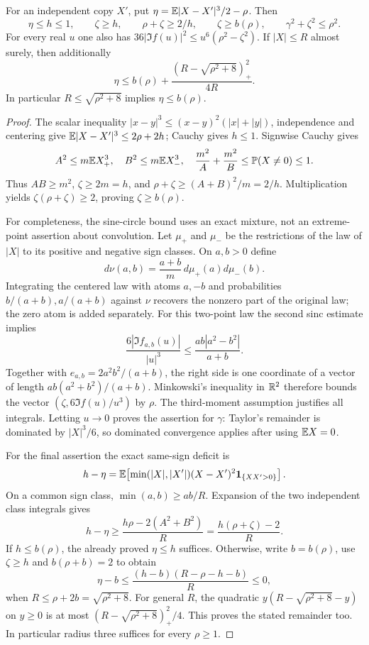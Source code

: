 \begin{lemma}\label{ext:fourier-surrogate}
For an independent copy $X'$, put
$\eta=\mathbb E|X-X'|^3/2-\rho$. Then
\[
 \eta\le h\le1,\qquad \zeta\ge h,\qquad
 \rho+\zeta\ge2/h,\qquad \zeta\ge b(\rho),
 \qquad \gamma^2+\zeta^2\le\rho^2.
\]
For every real $u$ one also has
$36|\Im f(u)|^2\le u^6(\rho^2-\zeta^2)$.
If $|X|\le R$ almost surely, then additionally
\[
 \eta\le b(\rho)+\frac{(R-\sqrt{\rho^2+8})_+^2}{4R}.
\]
In particular $R\le\sqrt{\rho^2+8}$ implies $\eta\le b(\rho)$.
\end{lemma}
\begin{proof}
The scalar inequality
$|x-y|^3\le(x-y)^2(|x|+|y|)$, independence and centering give
$\mathbb E|X-X'|^3\le2\rho+2h$; Cauchy gives $h\le1$.
Signwise Cauchy gives
\[
 A^2\le m\mathbb E X_+^3,\quad B^2\le m\mathbb E X_-^3,
 \quad \frac{m^2}{A}+\frac{m^2}{B}\le\mathbb P(X\ne0)\le1.
\]
Thus $AB\ge m^2$, $\zeta\ge2m=h$, and
$\rho+\zeta\ge(A+B)^2/m=2/h$. Multiplication yields
$\zeta(\rho+\zeta)\ge2$, proving $\zeta\ge b(\rho)$.

For completeness, the sine-circle bound uses an exact mixture, not an
extreme-point assertion about convolution. Let $\mu_+$ and $\mu_-$ be the
restrictions of the law of $|X|$ to its positive and negative sign classes.
On $a,b>0$ define
\[
 d\nu(a,b)=\frac{a+b}{m}\,d\mu_+(a)d\mu_-(b).
\]
Integrating the centered law with atoms $a,-b$ and probabilities
$b/(a+b),a/(a+b)$ against $\nu$ recovers the nonzero part of the original
law; the zero atom is added separately. For this two-point law the second
sinc estimate implies
\[
 \frac{6|\Im f_{a,b}(u)|}{|u|^3}
 \le\frac{ab|a^2-b^2|}{a+b}.
\]
Together with $e_{a,b}=2a^2b^2/(a+b)$, the right side is one coordinate
of a vector of length $ab(a^2+b^2)/(a+b)$. Minkowski's inequality in
$\mathbb R^2$ therefore bounds the vector
$(\zeta,6\Im f(u)/u^3)$ by $\rho$. The third-moment assumption
justifies all integrals. Letting $u\to0$ proves the assertion for $\gamma$:
Taylor's remainder is dominated by $|X|^3/6$, so dominated convergence
applies after using $\mathbb E X=0$.

For the final assertion the exact same-sign deficit is
\[
 h-\eta=\mathbb E\!\left[
 \min(|X|,|X'|)(X-X')^2\mathbf 1_{\{XX'>0\}}\right].
\]
On a common sign class, $\min(a,b)\ge ab/R$. Expansion of the two
independent class integrals gives
\[
 h-\eta\ge\frac{h\rho-2(A^2+B^2)}{R}
 =\frac{h(\rho+\zeta)-2}{R}.
\]
If $h\le b(\rho)$, the already proved $\eta\le h$ suffices. Otherwise,
write $b=b(\rho)$, use $\zeta\ge h$ and $b(\rho+b)=2$ to obtain
\[
 \eta-b\le\frac{(h-b)(R-\rho-h-b)}{R}\le0,
\]
when $R\le\rho+2b=\sqrt{\rho^2+8}$. For general $R$, the quadratic
$y(R-\sqrt{\rho^2+8}-y)$ on $y\ge0$ is at most
$(R-\sqrt{\rho^2+8})_+^2/4$. This proves the stated remainder too.
In particular radius three suffices for every $\rho\ge1$.
\end{proof}


